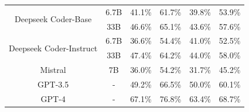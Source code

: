 \begin{table}[htbp]
\begin{tabular}{cccccc}
	\midrule
	\multirow{2}{*}{Deepseek Coder-Base}
	& 6.7B & 41.1\% & 61.7\% & 39.8\% & 53.9\% \\
	& 33B & 46.6\% & 65.1\% & 43.6\% & 57.6\% \\
	\midrule
	\multirow{2}{*}{Deepseek Coder-Instruct}
	& 6.7B & 36.6\% & 54.4\% & 41.0\% & 52.5\% \\
	& 33B & 47.4\% & 64.2\% & 44.0\% & 58.0\% \\
	\midrule
	Mistral
	& 7B & 36.0\% & 54.2\% & 31.7\% & 45.2\% \\
	\midrule
	GPT-3.5
	& - & 49.2\% & 66.5\% & 50.0\% & 60.1\% \\
	\midrule
	GPT-4
	& - & 67.1\% & 76.8\% & 63.4\% & 68.7\% \\
    \bottomrule
    \end{tabular}
    \label{tab:benchmark-results}
\end{table}



